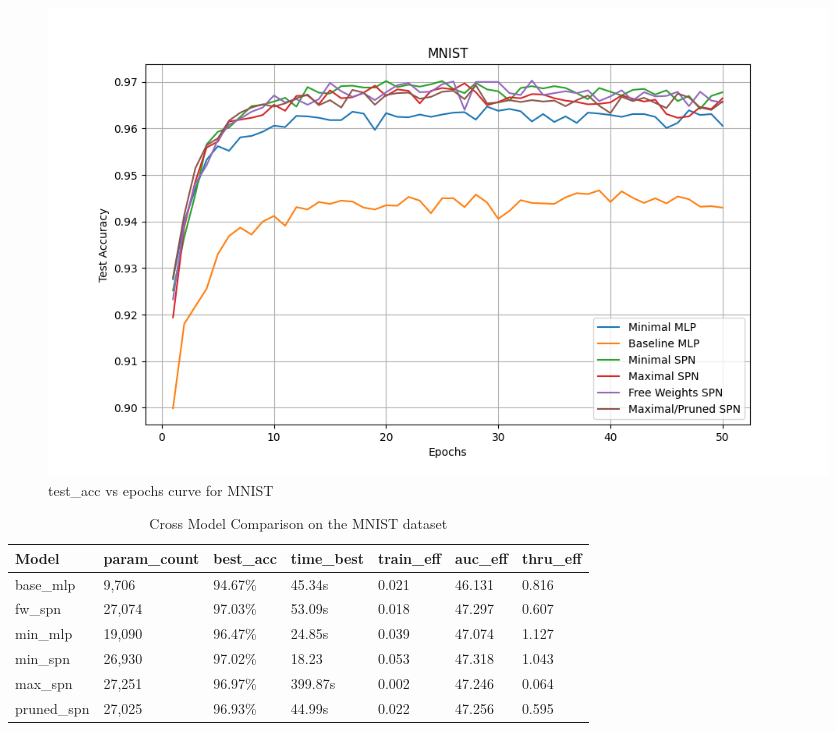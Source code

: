 \begin{figure}[H]
    \centering
    \includegraphics[width=\linewidth]{Figures/Results/MNIST/test_accuracy_plot.png} %
    \captionsetup{width=\linewidth}
    \caption{test\_acc vs epochs curve for MNIST}
    \label{fig:mnistTestCurve}
\end{figure}

\begin{table}[h!]
    \centering
    \caption{Cross Model Comparison on the MNIST dataset}
    \begin{tabular}{|l|l|l|l|l|l|l|}
    \hline
    \textbf{Model} & \textbf{param\_count} & \textbf{best\_acc} & \textbf{time\_best} & \textbf{train\_eff} & \textbf{auc\_eff} & \textbf{thru\_eff} \\
    \hline
    base\_mlp & 9,706 & \cellcolor{red!25}94.67\% & 45.34s & 0.021 & \cellcolor{red!25}46.131 & 0.816 \\
    fw\_spn & 27,074  & \cellcolor{green!25}97.03\% & 53.09s  & 0.018 & 47.297 & 0.607 \\
    min\_mlp & 19,090 & 96.47\% & 24.85s & 0.039 & 47.074 & \cellcolor{green!25}1.127 \\
    min\_spn & 26,930 & 97.02\% & \cellcolor{green!25}18.23  & \cellcolor{green!25}0.053 & \cellcolor{green!25}47.318 & 1.043 \\
    max\_spn & 27,251  & 96.97\% & \cellcolor{red!25}399.87s & \cellcolor{red!25}0.002 & 47.246 & \cellcolor{red!25}0.064 \\
    pruned\_spn & 27,025 & 96.93\% & 44.99s & 0.022 & 47.256 & 0.595 \\
    \hline
    \end{tabular}
    \label{tab:mnistResults}
\end{table}

